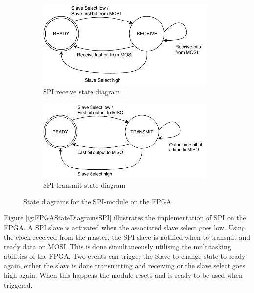 \documentclass[../../main.tex]{subfiles}
\begin{document}
\begin{figure}[h]
\begin{subfigure}{0.48\textwidth}
    \includegraphics[width = 0.97\textwidth]{Sections/System_Implementation/Images/FPGAStateDiagramReceiveSPI.pdf}
    \caption{SPI receive state diagram}
    \label{subfig:FPGAStateDiagramReceiveSPI}
\end{subfigure}\quad
\begin{subfigure}{0.48\textwidth}
    \includegraphics[width = 0.97\textwidth]{Sections/System_Implementation/Images/FPGAStateDiagramTransmitSPI.pdf}
    \caption{SPI transmit state diagram}
    \label{subfig:FPGAStateDiagramTransmitSPI}
\end{subfigure}
\caption{State diagrams for the SPI-module on the FPGA}
\label{fig:FPGAStateDiagramsSPI}
\end{figure}

\clearpage

Figure \ref{ig:FPGAStateDiagramsSPI} illustrates the implementation of SPI on the FPGA. A SPI slave is activated when the associated slave select goes low. Using the clock received from the master, the SPI slave is notified when to transmit and ready data on MOSI. This is done simultaneously utilising the multitasking abilities of the FPGA. Two events can trigger the Slave to change state to ready again, either the slave is done transmitting and receiving or the slave select goes high again. When this happens the module resets and is ready to be used when triggered.

\end{document}
